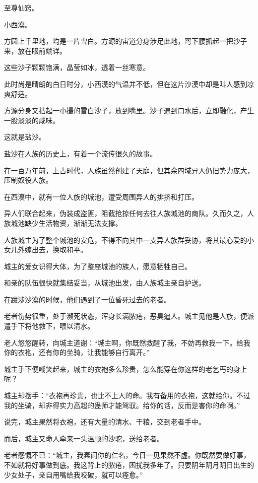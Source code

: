 
\begin{this_body}



至尊仙窍。

小西漠。

方圆上千里地，均是一片雪白。方源的宙道分身涉足此地，弯下腰抓起一把沙子来，放在眼前端详。

这些沙子颗颗饱满，晶莹如冰，透着一丝寒意。

此时尚是晴朗的白日时分，小西漠的气温并不低，但在这片沙漠中却是叫人感到凉爽舒适。

方源分身又拈起一小撮的雪白沙子，放到嘴里。沙子遇到口水后，立即融化，产生一股淡淡的咸味。

这就是盐沙。

盐沙在人族的历史上，有着一个流传很久的故事。

在一百万年前，上古时代，人族虽然创建了天庭，但其余四域异人仍旧势力庞大，压制奴役人族。

在西漠中，就有一位人族的城池，遭受周围异人的排挤和打压。

异人们联合起来，伪装成盗匪，阻截抢掠任何去往人族城池的商队。久而久之，人族城池缺少生活物资，渐渐无法支撑。

人族城主为了整个城池的安危，不得不向其中一支异人族群妥协，将其最心爱的小女儿外嫁出去，换取和平。

城主的爱女识得大体，为了整座城池的族人，愿意牺牲自己。

和亲的队伍很快就集结妥当，从城池出发，由人族城主亲自护送。

在跋涉沙漠的时候，他们遇到了一位昏死过去的老者。

老者伤势很重，处于濒死状态，浑身长满脓疮，恶臭逼人。城主见他是人族，便派遣手下将他救下，喂以清水。

老人悠悠醒转，向城主道谢：“城主啊，你既然救醒了我，不妨再救我一下。给我你的衣袍，还有你的坐骑，让我能够自行离开。”

城主手下便嘲笑起来，城主的衣袍多么珍贵，怎么能穿在你这样的老乞丐的身上呢？

城主却摆手：“衣袍再珍贵，也比不上人的命。我有备用的衣袍，这就给你。不过我的坐骑，却非得实力高超的蛊师才能驾驭。给你的话，反而是害你的命啊。”

说完，城主果然将衣袍，还有大量的清水、干粮，交到老者手中。

而后，城主又命人牵来一头温顺的沙驼，送给老者。

老者感慨不已：“城主，我素闻你的仁名，今日一见果然不虚。你既然要做好事，不如就将好事做到底。我这背上的脓疮，困扰我多年了。只要阴年阴月阴日出生的少女处子，亲自用嘴给我咬破，就可以痊愈。”


\end{this_body}
